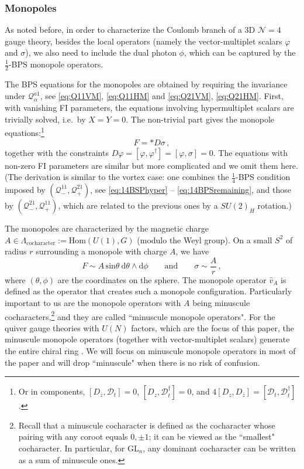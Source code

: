 \documentclass[12pt,a4paper]{article}
\renewcommand{\(}{\left(}
\renewcommand{\)}{\right)}
\renewcommand{\(}{\left(}
\renewcommand{\)}{\right)}
\begin{document}
\subsubsection{Monopoles}

As noted before, in order to characterize the Coulomb branch of a 3D $\mathcal{N}=4$ gauge theory, besides the local operators (namely the  vector-multiplet scalars $\varphi$ and $\sigma$), we also need to include the dual photon $\phi$, which can be captured by the $\frac{1}{2}$-BPS monopole operators.

The BPS equations for the monopoles are obtained by requiring the invariance under $\mathcal{Q}^{a\dot{1}}_\alpha$, see \eqref{eq:Q11VM}, \eqref{eq:Q11HM} and \eqref{eq:Q21VM}, \eqref{eq:Q21HM}. 
First, with vanishing FI parameters, the equations involving hypermultiplet scalars are trivially solved, i.e.\ by $X=Y=0$. The non-trivial part gives the monopole equations:\footnote{Or in components, 
$[D_{\bar{z}},\mathcal{D}_t]=0$, $[D_{z},\mathcal{D}^{\dag}_t]=0$, and $4[D_z,D_{\bar{z}}]=[\mathcal{D}_t,\mathcal{D}_t^{\dag}]$.
}
\begin{equation}
F=\ast D\sigma\,,
\end{equation}
\noindent
together with the constraints $D\varphi=[\varphi,\varphi^\dag]=[\varphi,\sigma]=0$.
The equations with non-zero FI parameters are similar but more complicated and we omit them here.
(The derivation is similar to the vortex case: one combines the $\frac{1}{4}$-BPS condition imposed by $(\mathcal{Q}^{1\dot{1}}_{-}, \mathcal{Q}^{2\dot{1}}_{+})$, see \eqref{eq:14BSPhyper} -- \eqref{eq:14BPSremaining}, and those by $(\mathcal{Q}^{2\dot{1}}_{-}, \mathcal{Q}^{1\dot{1}}_{+})$, which are related to the previous ones by a $SU(2)_H$ rotation.) 

The monopoles are characterized by the magnetic charge $A\in \Lambda_{\text{cocharacter}}:=\mathrm{Hom}(U(1),G)$ (modulo the Weyl group). 
On a small $S^2$ of radius $r$ surrounding a monopole with charge $A$, we have
\begin{equation}
F\sim A\, \mathrm{sin}\theta\ \mathrm{d}\theta\wedge \mathrm{d}\phi
\qquad\textrm{and}\qquad \sigma\sim \frac{A}{r}\,,
\end{equation}
where $(\theta,\phi)$ are the coordinates on the sphere. 
The monopole operator $\hat{v}_A$ is defined as the operator that creates such a monopole configuration. 
Particularly important to us are the monopole operators with $A$ being minuscule cocharacters,\footnote{Recall that a minuscule cocharacter is defined as the cocharacter whose pairing with any coroot equals $0,\pm 1$; it can be viewed as the ``smallest" cocharacter. 
In particular, for GL$_n$,  any dominant cocharacter
can be written as a sum of minuscule ones.}  and they are called ``minuscule monopole operators". 
For the quiver gauge theories with $U(N)$ factors, which are the focus of this paper, the minuscule monopole operators (together with vector-multiplet scalars) generate the entire chiral ring \cite{bullimore2015coulomb,Braverman:2016wma}. 
We will focus on minuscule monopole operators in most of the paper and will drop ``minuscule" when there is no risk of confusion. 
\end{document}
